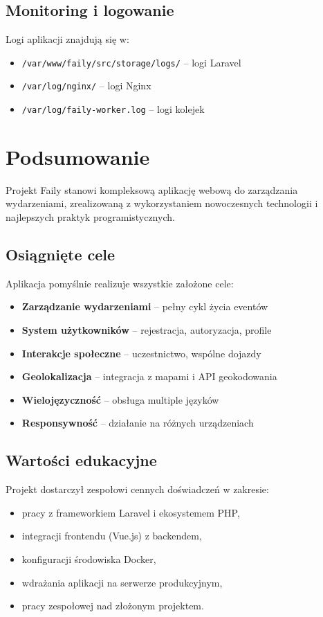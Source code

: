 \documentclass[12pt,a4paper]{article}
\begin{document}
\subsection{Monitoring i logowanie}

Logi aplikacji znajdują się w:
\begin{itemize}[itemsep=1pt]
    \item \texttt{/var/www/faily/src/storage/logs/} -- logi Laravel
    \item \texttt{/var/log/nginx/} -- logi Nginx
    \item \texttt{/var/log/faily-worker.log} -- logi kolejek
\end{itemize}

\newpage

\section{Podsumowanie}

Projekt Faily stanowi kompleksową aplikację webową do zarządzania wydarzeniami, zrealizowaną z wykorzystaniem nowoczesnych technologii i najlepszych praktyk programistycznych.

\subsection{Osiągnięte cele}

Aplikacja pomyślnie realizuje wszystkie założone cele:
\begin{itemize}[itemsep=2pt]
    \item \textbf{Zarządzanie wydarzeniami} -- pełny cykl życia eventów
    \item \textbf{System użytkowników} -- rejestracja, autoryzacja, profile
    \item \textbf{Interakcje społeczne} -- uczestnictwo, wspólne dojazdy
    \item \textbf{Geolokalizacja} -- integracja z mapami i API geokodowania
    \item \textbf{Wielojęzyczność} -- obsługa multiple języków
    \item \textbf{Responsywność} -- działanie na różnych urządzeniach
\end{itemize}

\subsection{Wartości edukacyjne}

Projekt dostarczył zespołowi cennych doświadczeń w zakresie:
\begin{itemize}[itemsep=2pt]
    \item pracy z frameworkiem Laravel i ekosystemem PHP,
    \item integracji frontendu (Vue.js) z backendem,
    \item konfiguracji środowiska Docker,
    \item wdrażania aplikacji na serwerze produkcyjnym,
    \item pracy zespołowej nad złożonym projektem.
\end{itemize}
\end{document}
